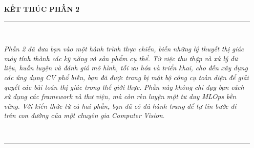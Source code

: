 \clearpage
\thispagestyle{empty}

\begin{center}
	\vspace*{4cm}
	{\Huge \textbf{KẾT THÚC PHẦN 2}} \\[1.5cm]
	
	\rule{0.8\textwidth}{0.4pt} \\[0.8cm]
	
	\parbox{0.9\textwidth}{
		\centering
		\textit{
			Phần 2 đã đưa bạn vào một hành trình thực chiến, biến những lý thuyết thị giác máy tính 
			thành các kỹ năng và sản phẩm cụ thể. Từ việc thu thập và xử lý dữ liệu, 
			huấn luyện và đánh giá mô hình, tối ưu hóa và triển khai, cho đến xây dựng 
			các ứng dụng CV phổ biến, bạn đã được trang bị một bộ công cụ toàn diện để 
			giải quyết các bài toán thị giác trong thế giới thực. Phần này không chỉ dạy bạn 
			cách sử dụng các framework và thư viện, mà còn rèn luyện một tư duy MLOps bền vững. 
			Với kiến thức từ cả hai phần, bạn đã có đủ hành trang để tự tin bước đi trên 
			con đường của một chuyên gia Computer Vision.
		}
	} \\[1cm]
	
	\rule{0.8\textwidth}{0.4pt} \\[2cm]
\end{center}